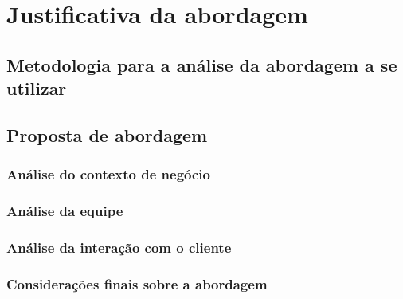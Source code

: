 \chapter[Justificativa da abordagem]{Justificativa da abordagem}
  
  \section{Metodologia para a análise da abordagem a se utilizar}
  
  \section{Proposta de abordagem}
    
    \subsection{Análise do contexto de negócio}
    
    \subsection{Análise da equipe}
    
    \subsection{Análise da interação com o cliente}
    
    \subsection{Considerações finais sobre a abordagem}